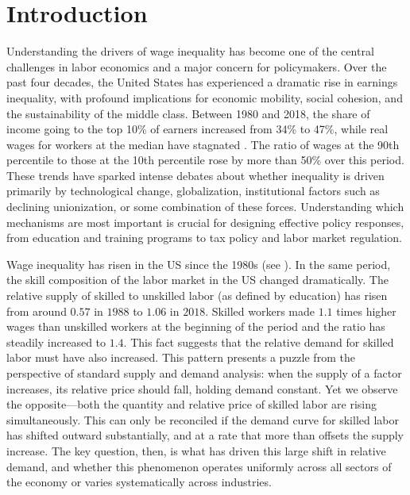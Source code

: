 \documentclass[12pt]{article}
\begin{document}
\thispagestyle{empty}

\pagebreak{}

\section{Introduction}\label{sec:introduction}

Understanding the drivers of wage inequality has become one of the central challenges in labor economics and a major concern for policymakers. Over the past four decades, the United States has experienced a dramatic rise in earnings inequality, with profound implications for economic mobility, social cohesion, and the sustainability of the middle class. Between 1980 and 2018, the share of income going to the top 10\% of earners increased from 34\% to 47\%, while real wages for workers at the median have stagnated \citep{piketty2014capital}. The ratio of wages at the 90th percentile to those at the 10th percentile rose by more than 50\% over this period. These trends have sparked intense debates about whether inequality is driven primarily by technological change, globalization, institutional factors such as declining unionization, or some combination of these forces. Understanding which mechanisms are most important is crucial for designing effective policy responses, from education and training programs to tax policy and labor market regulation.

Wage inequality has risen in the US since the 1980s (see \citet{acemoglu2011skills}). In the same period, the skill composition of the labor market in the US changed dramatically. The relative supply of skilled to unskilled labor (as defined by education) has risen from around $0.57$ in $1988$ to $1.06$ in $2018$. Skilled workers made $1.1$ times higher wages than unskilled workers at the beginning of the period and the ratio has steadily increased to $1.4$. This fact suggests that the relative demand for skilled labor must have also increased. This pattern presents a puzzle from the perspective of standard supply and demand analysis: when the supply of a factor increases, its relative price should fall, holding demand constant. Yet we observe the opposite---both the quantity and relative price of skilled labor are rising simultaneously. This can only be reconciled if the demand curve for skilled labor has shifted outward substantially, and at a rate that more than offsets the supply increase. The key question, then, is what has driven this large shift in relative demand, and whether this phenomenon operates uniformly across all sectors of the economy or varies systematically across industries.
\end{document}
